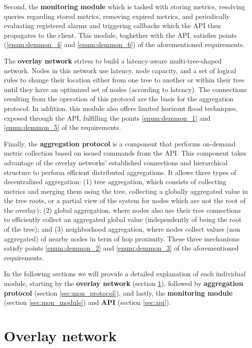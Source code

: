 Second, the \textbf{monitoring module} which is tasked with storing metrics, resolving queries regarding stored metrics, removing expired metrics, and periodically evaluating registered alarms and triggering callbacks which the API then propagates to the client. This module, toghether with the API, satisfies points (\ref{enum:demmon_4} and \ref{enum:demmon_6}) of the aforementioned requirements.

The \textbf{overlay network} strives to build a latency-aware multi-tree-shaped network. Nodes in this network use latency, node capacity, and a set of logical rules to change their location either from one tree to another or within their tree until they have an optimized set of nodes (according to latency). The connections resulting from the operation of this protocol are the basis for the aggregation protocol. In addition, this module also offers limited horizont flood techniques, exposed through the API, fulfilling the points \ref{enum:demmon_1} and \ref{enum:demmon_5} of the requirements.

Finally, the \textbf{aggregation protocol} is a component that performs on-demand metric collection based on issued commands from the API. This component takes advantage of the overlay networks' established connections and hierarchical structure to perform efficient distributed aggregations. It allows three types of decentralized aggregation: (1) tree aggregation, which consists of collecting metrics and merging them using the tree, collecting a globally aggregated value in the tree roots, or a partial view of the system for nodes which are not the root of the overlay); (2) global aggregation, where nodes also use their tree connections to efficiently collect an aggregated global value (independently of being the root of the tree); and (3) neighborhood aggregation, where nodes collect values (non aggregated) of nearby nodes in term of hop proximity. These three mechanisms satisfy points \ref{enum:demmon_2} and \ref{enum:demmon_3} of the aforementioned requirements. 

In the following sections we will provide a detailed explanation of each individual module, starting by the \textbf{overlay network} (section \ref{sec:overlay_network}), followed by \textbf{aggregation protocol} (section \ref{sec:mon_protocol}), and lastly, the \textbf{monitoring module} (section \ref{sec:mon_module}) and \textbf{API} (section \ref{sec:api}). 

\section{Overlay network} 
\label{sec:overlay_network}


